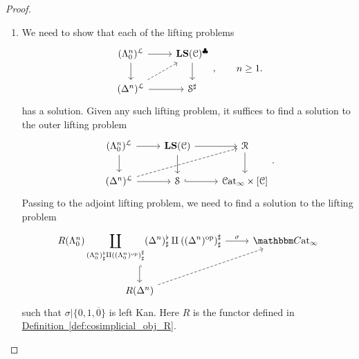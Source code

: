\documentclass[main.tex]{subfiles}
\begin{document}
\begin{proof}
\begin{enumerate}
    \item We need to show that each of the lifting problems
      \begin{equation*}
        \begin{tikzcd}
          (\Lambda^{n}_{0})^{\mathcal{L}}
          \arrow[r]
          \arrow[d]
          & \LS(\category{C})^{\clubsuit}
          \arrow[d]
          \\
          (\Delta^{n})^{\mathcal{L}}
          \arrow[r]
          \arrow[ur, dashed]
          & \S^{\sharp}
        \end{tikzcd},\qquad n \geq 1.
      \end{equation*}
      has a solution. Given any such lifting problem, it suffices to find a solution to the outer lifting problem
      \begin{equation*}
        \begin{tikzcd}
          (\Lambda^{n}_{0})^{\mathcal{L}}
          \arrow[r]
          \arrow[d]
          & \LS(\category{C})
          \arrow[d]
          \arrow[r]
          & \mathcal{R}
          \arrow[d]
          \\
          (\Delta^{n})^{\mathcal{L}}
          \arrow[r]
          \arrow[urr, dashed]
          & \S
          \arrow[r, hook]
          & \ICat \times [\category{C}]
        \end{tikzcd}.
      \end{equation*}
      Passing to the adjoint lifting problem, we need to find a solution to the lifting problem
      \begin{equation}
        \label{eq:unsimplified_lifting_problem}
        \begin{tikzcd}
          R(\Lambda^{n}_{0}) \displaystyle\coprod_{(\Lambda^{n}_{0})^{\flat}_{\sharp} \amalg ((\Lambda^{n}_{0})\op)^{\sharp}_{\sharp}}(\Delta^{n})^{\flat}_{\sharp} \amalg ((\Delta^{n})\op)^{\sharp}_{\sharp}
          \arrow[r, "\sigma"]
          \arrow[d, hook]
          & \ICCat
          \\
          R(\Delta^{n})
          \arrow[ur, dashed]
        \end{tikzcd}
      \end{equation}
      such that $\sigma|\{0,1,\overline{0}\}$ is left Kan. Here $R$ is the functor defined in \hyperref[def:cosimplicial_obj_R]{Definition~\ref*{def:cosimplicial_obj_R}}.


\end{enumerate}
\end{proof}
\end{document}
